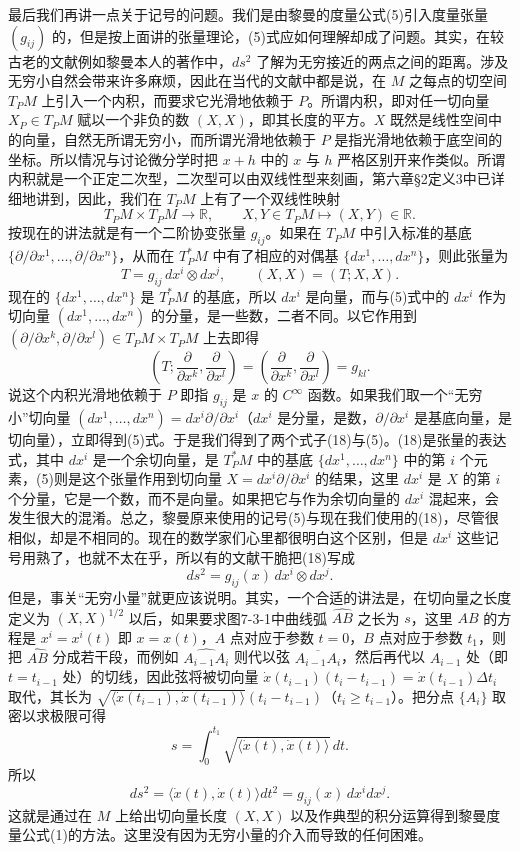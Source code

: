最后我们再讲一点关于记号的问题。我们是由黎曼的度量公式(5)引入度量张量 $(g_{ij})$ 的，但是按上面讲的张量理论，(5)式应如何理解却成了问题。其实，在较古老的文献例如黎曼本人的著作中，$ds^2$ 了解为无穷接近的两点之间的距离。涉及无穷小自然会带来许多麻烦，因此在当代的文献中都是说，在 $M$ 之每点的切空间 $T_PM$ 上引入一个内积，而要求它光滑地依赖于 $P$。所谓内积，即对任一切向量 $X_P\in T_PM$ 赋以一个非负的数 $(X,X)$，即其长度的平方。$X$ 既然是线性空间中的向量，自然无所谓无穷小，而所谓光滑地依赖于 $P$ 是指光滑地依赖于底空间的坐标。所以情况与讨论微分学时把 $x+h$ 中的 $x$ 与 $h$ 严格区别开来作类似。所谓内积就是一个正定二次型，二次型可以由双线性型来刻画，第六章§2定义3中已详细地讲到，因此，我们在 $T_PM$ 上有了一个双线性映射
\[
 T_PM\times T_PM\longrightarrow\mathbb R,
 \qquad X,Y\in T_PM\longmapsto(X,Y)\in\mathbb R.
\]
按现在的讲法就是有一个二阶协变张量 $g_{ij}$。如果在 $T_PM$ 中引入标准的基底 $\{\partial/\partial x^1,\ldots,\partial/\partial x^n\}$，从而在 $T_P^*M$ 中有了相应的对偶基 $\{dx^1,\ldots,dx^n\}$，则此张量为
\begin{equation}
 T=g_{ij}\,dx^i\otimes dx^j,\qquad (X,X)=(T;X,X).
 \tag{18}
\end{equation}
现在的 $\{dx^1,\ldots,dx^n\}$ 是 $T_P^*M$ 的基底，所以 $dx^i$ 是向量，而与(5)式中的 $dx^i$ 作为切向量 $(dx^1,\ldots,dx^n)$ 的分量，是一些数，二者不同。以它作用到 $(\partial/\partial x^k,\partial/\partial x^l)\in T_PM\times T_PM$ 上去即得
\[
 \left(T;\frac{\partial}{\partial x^k},\frac{\partial}{\partial x^l}\right)
 =\left(\frac{\partial}{\partial x^k},\frac{\partial}{\partial x^l}\right)=g_{kl}.
\]
说这个内积光滑地依赖于 $P$ 即指 $g_{ij}$ 是 $x$ 的 $C^\infty$ 函数。如果我们取一个“无穷小”切向量 $(dx^1,\ldots,dx^n)=dx^i\partial/\partial x^i$（$dx^i$ 是分量，是数，$\partial/\partial x^i$ 是基底向量，是切向量），立即得到(5)式。于是我们得到了两个式子(18)与(5)。(18)是张量的表达式，其中 $dx^i$ 是一个余切向量，是 $T_P^*M$ 中的基底 $\{dx^1,\ldots,dx^n\}$ 中的第 $i$ 个元素，(5)则是这个张量作用到切向量 $X=dx^i\partial/\partial x^i$ 的结果，这里 $dx^i$ 是 $X$ 的第 $i$ 个分量，它是一个数，而不是向量。如果把它与作为余切向量的 $dx^i$ 混起来，会发生很大的混淆。总之，黎曼原来使用的记号(5)与现在我们使用的(18)，尽管很相似，却是不相同的。现在的数学家们心里都很明白这个区别，但是 $dx^i$ 这些记号用熟了，也就不太在乎，所以有的文献干脆把(18)写成
\[
 ds^2=g_{ij}(x)\,dx^i\otimes dx^j.
\]
但是，事关“无穷小量”就更应该说明。其实，一个合适的讲法是，在切向量之长度定义为 $(X,X)^{1/2}$ 以后，如果要求图7-3-1中曲线弧 $\widehat{AB}$ 之长为 $s$，这里 $\widehat{AB}$ 的方程是 $x^i=x^i(t)$ 即 $x=x(t)$，$A$ 点对应于参数 $t=0$，$B$ 点对应于参数 $t_1$，则把 $\widehat{AB}$ 分成若干段，而例如 $\widehat{A_{i-1}A_i}$ 则代以弦 $\overline{A_{i-1}A_i}$，然后再代以 $A_{i-1}$ 处（即 $t=t_{i-1}$ 处）的切线，因此弦将被切向量 $\dot x(t_{i-1})(t_i-t_{i-1})=\dot x(t_{i-1})\Delta t_i$ 取代，其长为 $\sqrt{\langle\dot x(t_{i-1}),\dot x(t_{i-1})\rangle}(t_i-t_{i-1})$（$t_i\ge t_{i-1}$）。把分点 $\{A_i\}$ 取密以求极限可得
\[
 s=\int_0^{t_1}\sqrt{\langle\dot x(t),\dot x(t)\rangle}\,dt.
\]
所以
\[
 ds^2=\langle\dot x(t),\dot x(t)\rangle dt^2=g_{ij}(x)\,dx^i dx^j.
\]
这就是通过在 $M$ 上给出切向量长度 $(X,X)$ 以及作典型的积分运算得到黎曼度量公式(1)的方法。这里没有因为无穷小量的介入而导致的任何困难。

